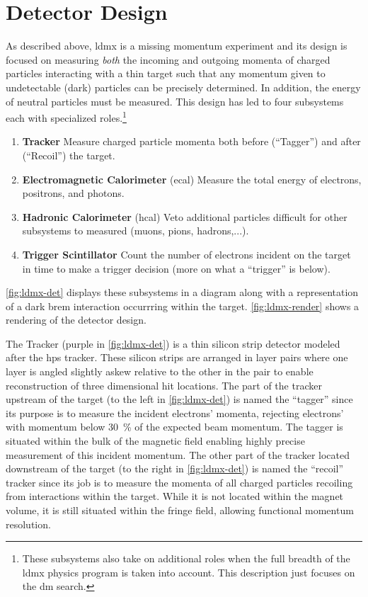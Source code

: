 \section{Detector Design}
As described above, \ac{ldmx} is a missing momentum experiment 
and its design is focused on measuring \emph{both} the
incoming and outgoing momenta of charged particles interacting with a thin target such that
any momentum given to undetectable (dark) particles can be precisely determined.
In addition, the energy of neutral particles must be measured.
This design has led to four subsystems each with specialized roles.\footnote{
	These subsystems also take on additional roles when the full breadth of the
	\ac{ldmx} physics program is taken into account.
	This description just focuses on the \ac{dm} search.
}
\begin{enumerate}
	\item \textbf{Tracker} Measure charged particle momenta both before (``Tagger'') and after (``Recoil'') the target.
	\item \textbf{Electromagnetic Calorimeter} (\ac{ecal}) Measure the total energy of electrons, positrons, and photons.
	\item \textbf{Hadronic Calorimeter} (\acs{hcal}) Veto additional particles difficult for other subsystems to measured (muons, pions, hadrons,...).
	\item \textbf{Trigger Scintillator} Count the number of electrons incident on the target in time to make a trigger decision (more on what a ``trigger'' is below).
\end{enumerate}
\cref{fig:ldmx-det} displays these subsystems in a diagram along with a representation of
a dark brem interaction occurrring within the target. \cref{fig:ldmx-render} shows a rendering
of the detector design.

The Tracker (purple in \cref{fig:ldmx-det}) is a thin silicon strip detector modeled after the
\ac{hps} tracker. These silicon strips are arranged in layer pairs where one layer is angled
slightly askew relative to the other in the pair to enable reconstruction of three dimensional hit
locations. The part of the tracker upstream of the target (to the left in \cref{fig:ldmx-det}) is
named the ``tagger'' since its purpose is to measure the incident electrons' momenta, rejecting
electrons' with momentum below \qty{30}{\percent} of the expected beam momentum. The tagger is situated within
the bulk of the magnetic field enabling highly precise measurement of this incident momentum. The
other part of the tracker located downstream of the target (to the right in \cref{fig:ldmx-det}) is
named the ``recoil'' tracker since its job is to measure the momenta of all charged particles
recoiling from interactions within the target. While it is not located within the magnet volume, it
is still situated within the fringe field, allowing functional momentum resolution.

